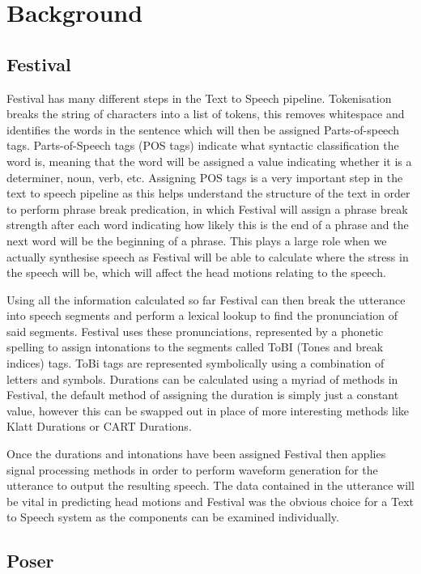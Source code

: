 \documentclass[bsc,frontabs,twoside,singlespacing,parskip]{infthesis}     %
\begin{document}
\chapter{Background}
\section{Festival}
Festival has many different steps in the Text to Speech pipeline. Tokenisation breaks the string of characters into a list of tokens, this removes whitespace and identifies the words in the sentence which will then be assigned Parts-of-speech tags. Parts-of-Speech tags (POS tags) indicate what syntactic classification the word is, meaning that the word will be assigned a value indicating whether it is a determiner, noun, verb, etc. Assigning POS tags is a very important step in the text to speech pipeline as this helps understand the structure of the text in order to perform phrase break predication, in which Festival will assign a phrase break strength after each word indicating how likely this is the end of a phrase and the next word will be the beginning of a phrase. This plays a large role when we actually synthesise speech as Festival will be able to calculate where the stress in the speech will be, which will affect the head motions relating to the speech.

Using all the information calculated so far Festival can then break the utterance into speech segments and perform a lexical lookup to find the pronunciation of said segments. Festival uses these pronunciations, represented by a phonetic spelling to assign intonations to the segments called ToBI (Tones and break indices) tags. ToBi tags are represented symbolically using a combination of letters and symbols. Durations can be calculated using a myriad of methods in Festival, the default method of assigning the duration is simply just a constant value, however this can be swapped out in place of more interesting methods like Klatt Durations or CART Durations. 

Once the durations and intonations have been assigned Festival then applies signal processing methods in order to perform waveform generation for the utterance to output the resulting speech. The data contained in the utterance will be vital in predicting head motions and Festival was the obvious choice for a Text to Speech system as the components can be examined individually.


\section{Poser}
\end{document}
